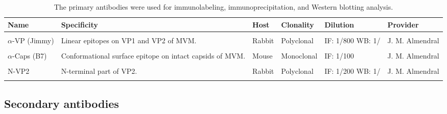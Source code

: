 \begin{small}
\begin{center}
\begin{table}[H]
\begin{tabular}{ P{2 cm} p{4.5cm} l l P{2.3 cm} p{3 cm}}
\textbf{Name} & \textbf{Specificity} & \textbf{Host} & \textbf{Clonality} & \textbf{Dilution} & \textbf{Provider}\\
\hline
\\
$\alpha$-VP (Jimmy) & Linear epitopes on VP1 and VP2 of MVM. & Rabbit & Polyclonal & IF: 1/800 WB: 1/  & J. M. Almendral\\ 
\\
$\alpha$-Caps \newline(B7) & Conformational surface epitope on intact capsids of MVM. & Mouse & Monoclonal & IF: 1/100 & J. M. Almendral \\ 
\\
N-VP2 & N-terminal part of VP2. & Rabbit & Polyclonal & IF: 1/200 WB: 1/ & J. M. Almendral\\
\\
\end{tabular}

\caption[Primary antibodies]{\normalsize The primary antibodies were used for immunolabeling, immunoprecipitation, and Western blotting analysis.}
\label{Primary antibodies}
\end{table}
\end{center}
\end{small}


\subsection{Secondary antibodies}

